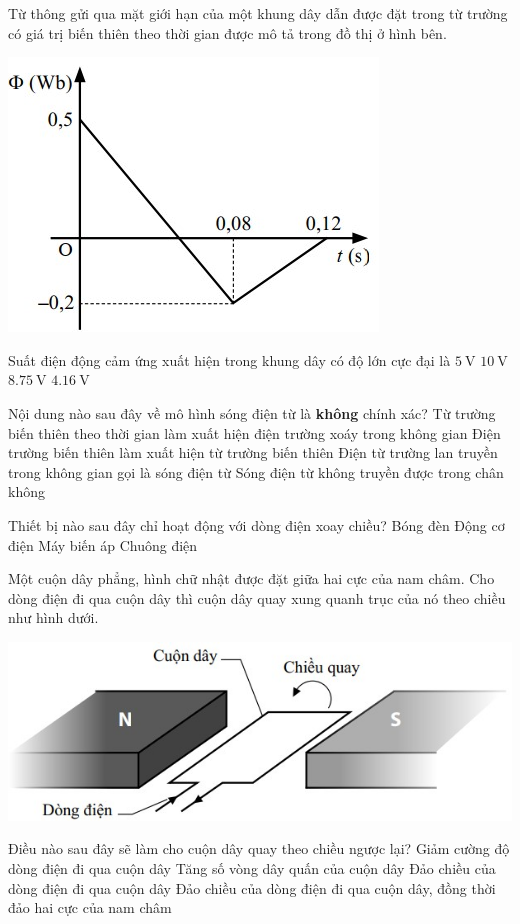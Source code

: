 \begin{ex}
	Từ thông gửi qua mặt giới hạn của một khung dây dẫn được đặt trong từ trường có giá trị biến thiên theo thời gian được mô tả trong đồ thị ở hình bên. 
	\begin{center}
		\includegraphics[width=0.3\linewidth]{figs/VN12-Y24-PH-SYL-025P-8}
	\end{center}
	Suất điện động cảm ứng xuất hiện trong khung dây có độ lớn cực đại là
	\choice
	{$\SI{5}{\volt}$}
	{$\SI{10}{\volt}$}
	{\True $\SI{8.75}{\volt}$}
	{$\SI{4.16}{\volt}$}
	\loigiai{}
\end{ex}
\begin{ex}
	Nội dung nào sau đây về mô hình sóng điện từ là \textbf{không} chính xác?
	\choice
	{Từ trường biến thiên theo thời gian làm xuất hiện điện trường xoáy trong không gian}
	{Điện trường biến thiên làm xuất hiện từ trường biến thiên}
	{Điện từ trường lan truyền trong không gian gọi là sóng điện từ}
	{\True Sóng điện từ không truyền được trong chân không}
	\loigiai{}
\end{ex}
\begin{ex}
	Thiết bị nào sau đây chỉ hoạt động với dòng điện xoay chiều?	
	\choice
	{Bóng đèn}
	{Động cơ điện}
	{\True Máy biến áp}
	{Chuông điện}
	\loigiai{}
\end{ex}
\begin{ex}
	Một cuộn dây phẳng, hình chữ nhật được đặt giữa hai cực của nam châm. Cho dòng điện đi qua cuộn dây thì cuộn dây quay xung quanh trục của nó theo chiều như hình dưới.
	\begin{center}
		\includegraphics[width=0.4\linewidth]{figs/VN12-Y24-PH-SYL-025P-9}
	\end{center}
	Điều nào sau đây sẽ làm cho cuộn dây quay theo chiều ngược lại?
	\choice
	{Giảm cường độ dòng điện đi qua cuộn dây}
	{Tăng số vòng dây quấn của cuộn dây}
	{\True Đảo chiều của dòng điện đi qua cuộn dây}
	{Đảo chiều của dòng điện đi qua cuộn dây, đồng thời đảo hai cực của nam châm}
	\loigiai{}
\end{ex}

